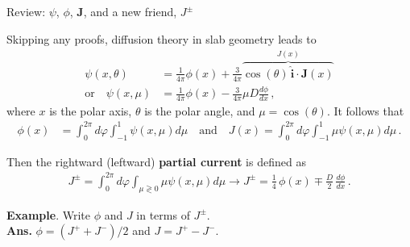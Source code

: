 \documentclass[aspectratio=1610]{beamer}
\newcommand{\flux}{\phi}
\begin{document}
\begin{frame}[fragile]{Review: $\psi$, $\phi$, $\mathbf{J}$, and a new friend, $J^{\pm}$}
 
Skipping any proofs, diffusion theory in slab geometry leads to
\begin{align*}
  \psi(x, \theta)  &= \frac{1}{4\pi} {\phi}(x) + \frac{3}{4\pi} \overbrace{\cos(\theta) \, \hat{\mathbf{i}} \cdot \mathbf{J}(x)}^{J(x)} \\
\text{or} \quad \psi(x, \mu)   &= \frac{1}{4\pi} \phi(x) - \frac{3}{4\pi} \mu D \frac{d\phi}{dx}   \, ,
\end{align*}
where $x$ is the polar axis, $\theta$ is the polar angle, and $\mu = \cos(\theta)$.  It follows that
\begin{align*}
  \phi(x) &= \int^{2 \pi}_0 d\varphi \int^1_{-1} \psi(x, \mu) d\mu \quad \text{and} \quad
  J(x)    = \int^{2 \pi}_0 d\varphi \int^1_{-1} \mu \psi(x, \mu)  d\mu \, .
\end{align*}

\vfill 
\pause 

Then the rightward (leftward) {\bf partial current} is defined as 
\begin{align*}
 J^{\pm} = \int^{2 \pi}_0 d\varphi \int_{\mu \gtrless 0} \mu \psi(x, \mu)  d\mu \rightarrow
   \boxed{ J^{\pm} = \frac{1}{4}\,\flux(x) \mp \frac{D}{2}\,\frac{d\phi}{dx} }\, .
\end{align*}

\vfill 
\pause 

{\small 
{\bf Example}.  Write $\phi$ and $J$ in terms of $J^{\pm}$.  \\
\pause 
{\bf Ans.} $\phi=(J^+ + J^-)/2$ and $J = J^+ - J^-$.
}
\end{frame}
\end{document}
